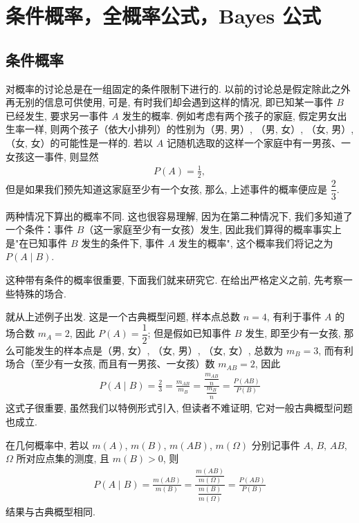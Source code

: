 \documentclass[../../main.tex]{subfiles}
\begin{document}
\section{条件概率，全概率公式，Bayes 公式}\label{section:ch02-条件概率全概率公式Bayes公式}

\subsection{条件概率}

对概率的讨论总是在一组固定的条件限制下进行的. 以前的讨论总是假定除此之外再无别的信息可供使用, 可是, 有时我们却会遇到这样的情况, 即已知某一事件 $B$ 已经发生, 要求另一事件 $A$ 发生的概率. 例如考虑有两个孩子的家庭, 假定男女出生率一样, 则两个孩子（依大小排列）的性别为（男, 男）, （男, 女）, （女, 男）, （女, 女）的可能性是一样的. 若以 $A$ 记随机选取的这样一个家庭中有一男孩、一女孩这一事件, 则显然
\begin{align*}
P(A)=\frac{1}{2},
\end{align*}
但是如果我们预先知道这家庭至少有一个女孩, 那么, 上述事件的概率便应是 $\dfrac{2}{3}$.

两种情况下算出的概率不同. 这也很容易理解, 因为在第二种情况下, 我们多知道了一个条件：事件 $B$（这一家庭至少有一女孩）发生, 因此我们算得的概率事实上是"在已知事件 $B$ 发生的条件下, 事件 $A$ 发生的概率", 这个概率我们将记之为 $P(A\mid B)$.

这种带有条件的概率很重要, 下面我们就来研究它. 在给出严格定义之前, 先考察一些特殊的场合.

就从上述例子出发. 这是一个古典概型问题, 样本点总数 $n=4$, 有利于事件 $A$ 的场合数 $m_A=2$, 因此 $P(A)=\dfrac{1}{2}$; 但是假如已知事件 $B$ 发生, 即至少有一女孩, 那么可能发生的样本点是（男, 女）, （女, 男）, （女, 女）, 总数为 $m_B=3$, 而有利场合（至少有一女孩, 而且有一男孩、一女孩）数 $m_{AB}=2$, 因此
\begin{align}
P(A\mid B)=\frac{2}{3}=\frac{m_{AB}}{m_B}=\frac{\dfrac{m_{AB}}{n}}{\dfrac{m_B}{n}}=\frac{P(AB)}{P(B)}
\end{align}
这式子很重要, 虽然我们以特例形式引入, 但读者不难证明, 它对一般古典概型问题也成立.

在几何概率中, 若以 $m(A)$, $m(B)$, $m(AB)$, $m(\Omega)$ 分别记事件 $A$, $B$, $AB$, $\Omega$ 所对应点集的测度, 且 $m(B)>0$, 则
\begin{align*}
P(A\mid B)=\frac{m(AB)}{m(B)}=\frac{\dfrac{m(AB)}{m(\Omega)}}{\dfrac{m(B)}{m(\Omega)}}=\frac{P(AB)}{P(B)}
\end{align*}
结果与古典概型相同.
\end{document}
